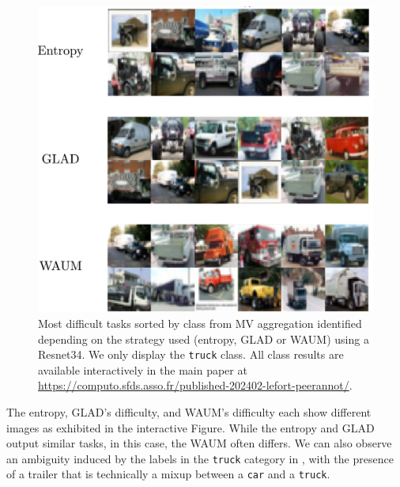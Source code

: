 \begin{figure}[htb]
    \centering
    \includegraphics[width=.8\textwidth]{./images_peerannot/c10h_identification.pdf}
    \caption{Most difficult tasks sorted by class from MV aggregation identified depending on the strategy used (entropy, GLAD or WAUM) using a Resnet34. We only display the \texttt{truck} class. All class results are available interactively in the main paper at \url{https://computo.sfds.asso.fr/published-202402-lefort-peerannot/}.}
    \label{fig:identfication_c10h}
\end{figure}

The entropy, GLAD's difficulty, and WAUM's difficulty each show different images as exhibited in the interactive Figure. While the entropy and GLAD output similar tasks, in this case, the WAUM often differs. We can also observe an ambiguity induced by the labels in the \texttt{truck} category in , with the presence of a trailer that is technically a mixup between a \texttt{car} and a \texttt{truck}.

